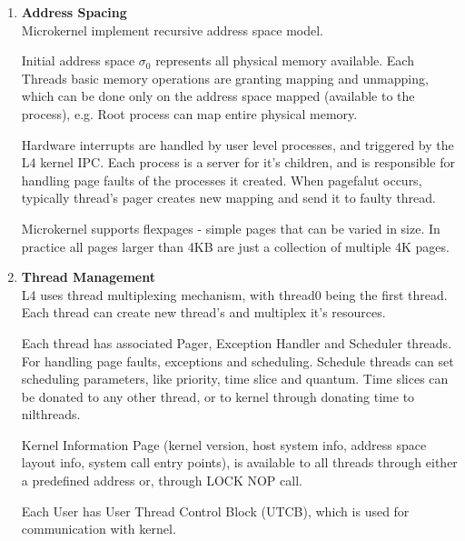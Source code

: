 \documentclass{article}
\begin{document}
        \begin{enumerate}[1., leftmargin = 0.7cm, nosep]
            \item \textbf{Address Spacing} \\
                Microkernel implement recursive address space model.

                Initial address space $\sigma_0$ represents all physical memory available. Each
                Threads
                basic memory operations are granting mapping and unmapping, which can be done only
                on the address space mapped (available to the process), e.g. Root process can map
                entire physical memory.

                Hardware interrupts are handled by user level processes, and triggered by the L4
                kernel IPC.
                Each process is a server for it's children, and is responsible for handling page
                faults of the processes it created. When pagefalut occurs, typically thread's
                pager creates new mapping and send it to faulty thread.

                Microkernel supports flexpages - simple pages that can be varied in size. In
                practice all pages larger than 4KB are just a collection of multiple 4K
                pages.

            \item \textbf{Thread Management}\\

                L4 uses thread multiplexing mechanism, with thread0 being the first thread. Each
                thread can create new thread's and multiplex it's resources.

                Each thread has associated Pager, Exception Handler and Scheduler threads.
                For handling page faults, exceptions and scheduling. Schedule threads can set
                scheduling parameters, like priority, time slice and quantum. Time slices can
                be donated to any other thread, or to kernel through donating time to
                nilthreads.

                Kernel Information Page (kernel version, host system info, address space layout
                info, system call entry points), is available to all threads through either a
                predefined address or, through LOCK NOP call.


                Each User has User Thread Control Block (UTCB), which is used for communication
                with kernel.


\end{enumerate}
\end{document}
